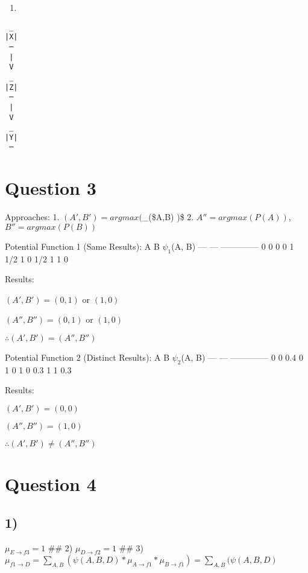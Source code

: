 \begin{enumerate}
\item 

\end{enumerate}

\begin{verbatim}
 _
|X|
 ─
 |
 V
 _
|Z|
 ─
 |
 V
 _
|Y|
 ─
\end{verbatim}

\part{Question 3}
\label{question3}

Approaches: 1. $(A',B') = argmax($\_(\$A,B) )\$ 2.
$A'' = argmax(P(A))$, $B'' = argmax(P(B))$

Potential Function 1 (Same Results): \textbar{} A \textbar{} B \textbar{} $\psi_1$(A, B) \textbar{} \textbar{} —
\textbar{} — \textbar{} ————– \textbar{} \textbar{} 0 \textbar{} 0 \textbar{} 0 \textbar{} \textbar{} 0 \textbar{} 1 \textbar{} 1\slash 2 \textbar{} \textbar{} 1 \textbar{} 0 \textbar{} 1\slash 2
\textbar{} \textbar{} 1 \textbar{} 1 \textbar{} 0 \textbar{}

Results:

$(A',B') = (0,1)$ or $(1,0)$

$(A'',B'') = (0,1)$ or $(1,0)$

$\therefore (A',B')=(A'',B'')$

Potential Function 2 (Distinct Results): \textbar{} A \textbar{} B \textbar{} $\psi_2$(A, B) \textbar{}
\textbar{} — \textbar{} — \textbar{} ————– \textbar{} \textbar{} 0 \textbar{} 0 \textbar{} 0.4 \textbar{} \textbar{} 0 \textbar{} 1 \textbar{} 0 \textbar{} \textbar{} 1 \textbar{} 0 \textbar{}
0.3 \textbar{} \textbar{} 1 \textbar{} 1 \textbar{} 0.3 \textbar{}

Results:

$(A',B') = (0,0)$

$(A'',B'') = (1,0)$

$\therefore (A',B')\ne(A'',B'')$

\part{Question 4}
\label{question4}

\chapter{1)}
\label{1}

$\mu_{E \rightarrow f3} = 1$ \#\# 2) $\mu_{D \rightarrow f2} = 1$ \#\#
3)
$\mu_{f1 \rightarrow D} = \sum_{A,B}(\psi(A,B,D) * \mu_{A \rightarrow f1}* \mu_{B \rightarrow f1})=\sum_{A,B}(\psi(A,B,D)$

